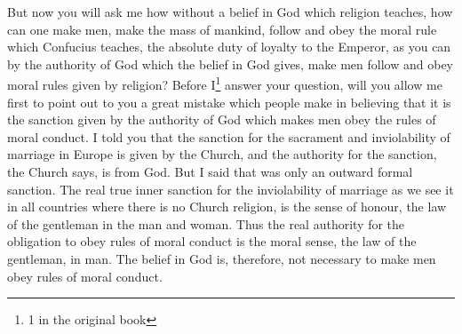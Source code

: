 But now you will ask me how without a belief in God which religion teaches, how can one make men, make the mass of mankind, follow and obey the moral rule which Confucius teaches, the absolute duty of loyalty to the Emperor, as you can by the authority of God which the belief in God gives, make men follow and obey moral rules given by religion?
Before I\footnote{1 in the original book} answer your question, will you allow me first to point out to you a great mistake which people make in believing that it is the sanction given by the authority of God which makes men obey the rules of moral conduct.
I told you that the sanction for the sacrament and inviolability of marriage in Europe is given by the Church, and the authority for the sanction, the Church says, is from God.
But I said that was only an outward formal sanction.
The real true inner sanction for the inviolability of marriage as we see it in all countries where there is no Church religion, is the sense of honour, the law of the gentleman in the man and woman.
Thus the real authority for the obligation to obey rules of moral conduct is the moral sense, the law of the gentleman, in man.
The belief in God is, therefore, not necessary to make men obey rules of moral conduct.

